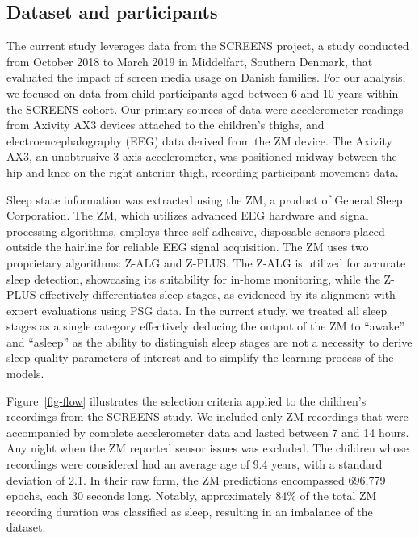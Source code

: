 \documentclass[
  super,
  preprint,
  3p]{elsarticle}
\begin{document}
\hypertarget{dataset-and-participants}{%
\subsection{Dataset and participants}\label{dataset-and-participants}}

The current study leverages data from the SCREENS
project\citep{rasmussen2020}, a study conducted from October 2018 to
March 2019 in Middelfart, Southern Denmark, that evaluated the impact of
screen media usage on Danish families. For our analysis, we focused on
data from child participants aged between 6 and 10 years within the
SCREENS cohort. Our primary sources of data were accelerometer readings
from Axivity AX3 devices attached to the children's thighs, and
electroencephalography (EEG) data derived from the ZM device. The
Axivity AX3, an unobtrusive 3-axis accelerometer, was positioned midway
between the hip and knee on the right anterior thigh, recording
participant movement data.

Sleep state information was extracted using the ZM, a product of General
Sleep Corporation. The ZM, which utilizes advanced EEG hardware and
signal processing algorithms, employs three self-adhesive, disposable
sensors placed outside the hairline for reliable EEG signal acquisition.
The ZM uses two proprietary algorithms: Z-ALG and Z-PLUS. The Z-ALG is
utilized for accurate sleep detection, showcasing its suitability for
in-home monitoring\citep{kaplan2014}, while the Z-PLUS effectively
differentiates sleep stages, as evidenced by its alignment with expert
evaluations using PSG data\citep{wang2015}. In the current study, we
treated all sleep stages as a single category effectively deducing the
output of the ZM to ``awake'' and ``asleep'' as the ability to
distinguish sleep stages are not a necessity to derive sleep quality
parameters of interest and to simplify the learning process of the
models.

Figure~\ref{fig-flow} illustrates the selection criteria applied to the
children's recordings from the SCREENS study. We included only ZM
recordings that were accompanied by complete accelerometer data and
lasted between 7 and 14 hours. Any night when the ZM reported sensor
issues was excluded. The children whose recordings were considered had
an average age of 9.4 years, with a standard deviation of 2.1. In their
raw form, the ZM predictions encompassed 696,779 epochs, each 30 seconds
long. Notably, approximately 84\% of the total ZM recording duration was
classified as sleep, resulting in an imbalance of the dataset.
\end{document}
